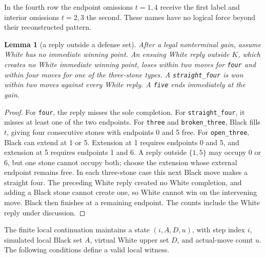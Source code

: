 \documentclass[11pt]{article}
\newtheorem{lemma}[theorem]{Lemma}
\theoremstyle{definition}
\theoremstyle{remark}
\begin{document}
In the fourth row the endpoint omissions \(t=1,4\) receive the first label and interior omissions \(t=2,3\) the second. These names have no logical force beyond their reconstructed pattern.

\begin{lemma}[a reply outside a defense set]\label{mac:operator-reply}
After a legal nonterminal gain, assume White has no immediate winning point. An ensuing White reply outside \(K\), which creates no White immediate winning point, loses within two moves for \texttt{four} and within four moves for one of the three-stone types. A \texttt{straight\_four} is won within two moves against every White reply. A \texttt{five} ends immediately at the gain.

\end{lemma}
\begin{proof}
For \texttt{four}, the reply misses the sole completion. For \texttt{straight\_four}, it misses at least one of the two endpoints. For \texttt{three} and \texttt{broken\_three}, Black fills \(t\), giving four consecutive stones with endpoints 0 and 5 free. For \texttt{open\_three}, Black can extend at 1 or 5. Extension at 1 requires endpoints 0 and 5, and extension at 5 requires endpoints 1 and 6. A reply outside \(\{1,5\}\) may occupy 0 or 6, but one stone cannot occupy both; choose the extension whose external endpoint remains free. In each three-stone case this next Black move makes a straight four. The preceding White reply created no White completion, and adding a Black stone cannot create one, so White cannot win on the intervening move. Black then finishes at a remaining endpoint. The counts include the White reply under discussion. 
\end{proof}

The finite local continuation maintains a state \((i,A,D,u)\), with step index \(i\), simulated local Black set \(A\), virtual White upper set \(D\), and actual-move count \(u\). The following conditions define a valid local witness.
\end{document}
